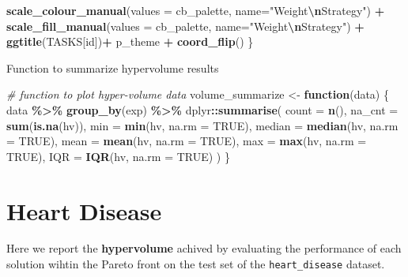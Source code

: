 \documentclass[
]{book}
\newenvironment{Shaded}{\begin{snugshade}}{\end{snugshade}}
\newcommand{\AttributeTok}[1]{\textcolor[rgb]{0.13,0.29,0.53}{#1}}
\newcommand{\CommentTok}[1]{\textcolor[rgb]{0.56,0.35,0.01}{\textit{#1}}}
\newcommand{\ConstantTok}[1]{\textcolor[rgb]{0.56,0.35,0.01}{#1}}
\newcommand{\ControlFlowTok}[1]{\textcolor[rgb]{0.13,0.29,0.53}{\textbf{#1}}}
\newcommand{\FunctionTok}[1]{\textcolor[rgb]{0.13,0.29,0.53}{\textbf{#1}}}
\newcommand{\NormalTok}[1]{#1}
\newcommand{\OtherTok}[1]{\textcolor[rgb]{0.56,0.35,0.01}{#1}}
\newcommand{\SpecialCharTok}[1]{\textcolor[rgb]{0.81,0.36,0.00}{\textbf{#1}}}
\newcommand{\StringTok}[1]{\textcolor[rgb]{0.31,0.60,0.02}{#1}}
\begin{document}
\begin{Shaded}
\begin{Highlighting}[]
    \FunctionTok{scale\_colour\_manual}\NormalTok{(}\AttributeTok{values =}\NormalTok{ cb\_palette, }\AttributeTok{name=}\StringTok{"Weight}\SpecialCharTok{\textbackslash{}n}\StringTok{Strategy"}\NormalTok{) }\SpecialCharTok{+}
    \FunctionTok{scale\_fill\_manual}\NormalTok{(}\AttributeTok{values =}\NormalTok{ cb\_palette, }\AttributeTok{name=}\StringTok{"Weight}\SpecialCharTok{\textbackslash{}n}\StringTok{Strategy"}\NormalTok{) }\SpecialCharTok{+}
    \FunctionTok{ggtitle}\NormalTok{(TASKS[id])}\SpecialCharTok{+}
\NormalTok{    p\_theme }\SpecialCharTok{+} \FunctionTok{coord\_flip}\NormalTok{()}
\NormalTok{  \}}
\end{Highlighting}
\end{Shaded}

Function to summarize hypervolume results

\begin{Shaded}
\begin{Highlighting}[]
\CommentTok{\# function to plot hyper{-}volume data}
\NormalTok{volume\_summarize }\OtherTok{\textless{}{-}} \ControlFlowTok{function}\NormalTok{(data)}
\NormalTok{  \{}
\NormalTok{    data }\SpecialCharTok{\%\textgreater{}\%}
    \FunctionTok{group\_by}\NormalTok{(exp) }\SpecialCharTok{\%\textgreater{}\%}
\NormalTok{    dplyr}\SpecialCharTok{::}\FunctionTok{summarise}\NormalTok{(}
      \AttributeTok{count =} \FunctionTok{n}\NormalTok{(),}
      \AttributeTok{na\_cnt =} \FunctionTok{sum}\NormalTok{(}\FunctionTok{is.na}\NormalTok{(hv)),}
      \AttributeTok{min =} \FunctionTok{min}\NormalTok{(hv, }\AttributeTok{na.rm =} \ConstantTok{TRUE}\NormalTok{),}
      \AttributeTok{median =} \FunctionTok{median}\NormalTok{(hv, }\AttributeTok{na.rm =} \ConstantTok{TRUE}\NormalTok{),}
      \AttributeTok{mean =} \FunctionTok{mean}\NormalTok{(hv, }\AttributeTok{na.rm =} \ConstantTok{TRUE}\NormalTok{),}
      \AttributeTok{max =} \FunctionTok{max}\NormalTok{(hv, }\AttributeTok{na.rm =} \ConstantTok{TRUE}\NormalTok{),}
      \AttributeTok{IQR =} \FunctionTok{IQR}\NormalTok{(hv, }\AttributeTok{na.rm =} \ConstantTok{TRUE}\NormalTok{)}
\NormalTok{    )}
\NormalTok{  \}}
\end{Highlighting}
\end{Shaded}

\hypertarget{heart-disease}{%
\chapter{Heart Disease}\label{heart-disease}}

Here we report the \textbf{hypervolume} achived by evaluating the performance of each solution wihtin the Pareto front on the test set of the \texttt{heart\_disease} dataset.
\end{document}
